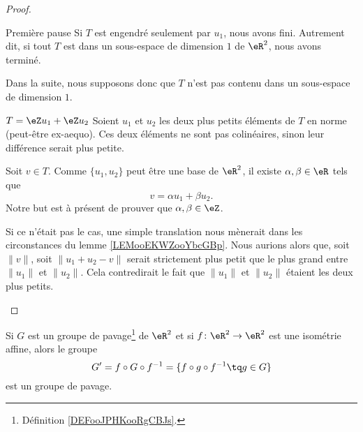 \begin{proof}
\begin{subproof}
		\item[Première pause]
		Si \( T\) est engendré seulement par \( u_1\), nous avons fini. Autrement dit, si tout \( T\) est dans un sous-espace de dimension \( 1\) de \( \eR^2\), nous avons terminé.

		Dans la suite, nous supposons donc que \( T\) n'est pas contenu dans un sous-espace de dimension \( 1\).

		\item[\( T=\eZ u_1 + \eZ u_2\)]
		Soient \( u_1\) et \( u_2\) les deux plus petits éléments de \( T\) en norme (peut-être ex-aequo). Ces deux éléments ne sont pas colinéaires, sinon leur différence serait plus petite.

		Soit \( v\in T\). Comme \( \{ u_1,u_2 \}\) peut être une base de \( \eR^2\), il existe \( \alpha,\beta\in \eR\) tels que
		\begin{equation}
			v=\alpha u_1+\beta u_2.
		\end{equation}
		Notre but est à présent de prouver que \( \alpha,\beta\in \eZ\).

		Si ce n'était pas le cas, une simple translation nous mènerait dans les circonstances du lemme \ref{LEMooEKWZooYbcGBp}. Nous aurions alors que, soit \( \| v \|\), soit \(\| u_1+u_2-v \|\) serait strictement plus petit que le plus grand entre \( \| u_1 \|\) et \( \| u_2 \|\). Cela contredirait le fait que \( \| u_1 \|\) et \( \| u_2 \|\) étaient les deux plus petits.
	\end{subproof}
\end{proof}

\begin{proposition}      \label{PROPooPQYXooIDZlHy}
	Si \( G\) est un groupe de pavage\footnote{Définition \ref{DEFooJPHKooRgCBJs}.} de \( \eR^2\) et si \( f\colon \eR^2\to \eR^2\) est une isométrie affine, alors le groupe
	\begin{equation}
		G'=f\circ G\circ f^{-1}=\{f\circ g\circ f^{-1}\tq g\in G\}
	\end{equation}
	est un groupe de pavage.
\end{proposition}

